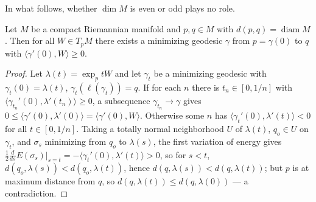 In what follows, whether $\dim M$ is even or odd plays no role.

\begin{lemma}
  \label{lem:dc-ch13-4-1}
  Let $M$ be a compact Riemannian manifold and $p,q\in M$ with
  $d(p,q)=\operatorname{diam}M$. Then for all $W\in T_pM$ there exists a minimizing
  geodesic $\gamma$ from $p=\gamma(0)$ to $q$ with $\langle\gamma'(0),W\rangle\geq0$.
\end{lemma}
\begin{proof}
\sketch
  Let $\lambda(t)=\exp_p tW$ and let $\gamma_t$ be a minimizing geodesic with
  $\gamma_t(0)=\lambda(t)$, $\gamma_t(\ell(\gamma_t))=q$. If for each $n$ there is
  $t_n\in[0,1/n]$ with $\langle\gamma_{t_n}'(0),\lambda'(t_n)\rangle\geq0$, a
  subsequence $\gamma_{t_n}\to\gamma$ gives
  $0\leq\langle\gamma'(0),\lambda'(0)\rangle=\langle\gamma'(0),W\rangle$. Otherwise
  some $n$ has $\langle\gamma_t'(0),\lambda'(t)\rangle<0$ for all $t\in[0,1/n]$. Taking
  a totally normal neighborhood $U$ of $\lambda(t)$, $q_o\in U$ on $\gamma_t$, and
  $\sigma_s$ minimizing from $q_o$ to $\lambda(s)$, the first variation of energy gives
  $\tfrac{1}{2}\frac{d}{ds}E(\sigma_s)|_{s=t}=-\langle\gamma_t'(0),\lambda'(t)\rangle>0$,
  so for $s<t$, $d(q_o,\lambda(s))<d(q_o,\lambda(t))$, hence
  $d(q,\lambda(s))<d(q,\lambda(t))$; but $p$ is at maximum distance from $q$, so
  $d(q,\lambda(t))\leq d(q,\lambda(0))$ — a contradiction.
\end{proof}

